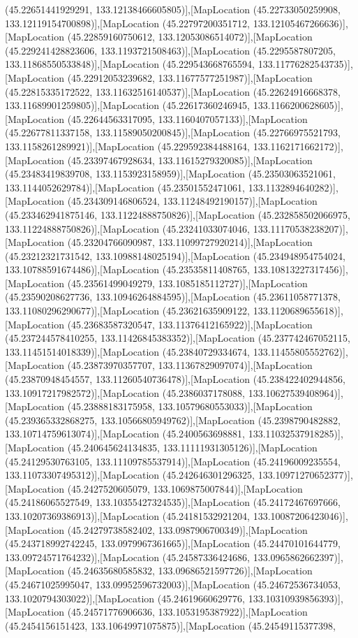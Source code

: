 (45.22651441929291, 133.12138466605805)],[MapLocation (45.22733050259908, 133.12119154700898)],[MapLocation (45.22797200351712, 133.12105467266636)],[MapLocation (45.22859160750612, 133.12053086514072)],[MapLocation (45.229241428823606, 133.1193721508463)],[MapLocation (45.2295587807205, 133.11868550533848)],[MapLocation (45.229543668765594, 133.11776282543735)],[MapLocation (45.22912053239682, 133.11677577251987)],[MapLocation (45.22815335172522, 133.11632516140537)],[MapLocation (45.22624916668378, 133.11689901259805)],[MapLocation (45.22617360246945, 133.1166200628605)],[MapLocation (45.22644563317095, 133.1160407057133)],[MapLocation (45.22677811337158, 133.11589050200845)],[MapLocation (45.22766975521793, 133.1158261289921)],[MapLocation (45.229592384488164, 133.1162171662172)],[MapLocation (45.23397467928634, 133.11615279320085)],[MapLocation (45.23483419839708, 133.1153923158959)],[MapLocation (45.23503063521061, 133.1144052629784)],[MapLocation (45.23501552471061, 133.1132894640282)],[MapLocation (45.234309146806524, 133.11248492190157)],[MapLocation (45.233462941875146, 133.11224888750826)],[MapLocation (45.232858502066975, 133.11224888750826)],[MapLocation (45.23241033074046, 133.11170538238207)],[MapLocation (45.23204766090987, 133.11099727920214)],[MapLocation (45.23212321731542, 133.10988148025194)],[MapLocation (45.234948954754024, 133.10788591674486)],[MapLocation (45.23535811408765, 133.10813227317456)],[MapLocation (45.23561499049279, 133.1085185112727)],[MapLocation (45.23590208627736, 133.10946264884595)],[MapLocation (45.23611058771378, 133.11080296290677)],[MapLocation (45.23621635909122, 133.1120689655618)],[MapLocation (45.23683587320547, 133.11376412165922)],[MapLocation (45.237244578410255, 133.11426845383352)],[MapLocation (45.237742467052115, 133.11451514018339)],[MapLocation (45.23840729334674, 133.11455805552762)],[MapLocation (45.23873970357707, 133.11367829097074)],[MapLocation (45.23870948454557, 133.11260540736478)],[MapLocation (45.238422402944856, 133.10917217982572)],[MapLocation (45.2386037178088, 133.10627539408964)],[MapLocation (45.23888183175958, 133.10579680553033)],[MapLocation (45.239365332868275, 133.10566805949762)],[MapLocation (45.2398790482882, 133.10714759613074)],[MapLocation (45.2400563698881, 133.11032537918285)],[MapLocation (45.240645624134835, 133.11111931305126)],[MapLocation (45.24129530763105, 133.11109785537914)],[MapLocation (45.24196009235554, 133.11073307495312)],[MapLocation (45.242646301296325, 133.10971270652377)],[MapLocation (45.2427520605079, 133.1069875007844)],[MapLocation (45.24186065527549, 133.10355427324535)],[MapLocation (45.24172467697666, 133.10207369386913)],[MapLocation (45.24181532921204, 133.10087206423046)],[MapLocation (45.24279738582402, 133.0987906700349)],[MapLocation (45.243718992742245, 133.0979967361665)],[MapLocation (45.24470101644779, 133.09724571764232)],[MapLocation (45.24587336424686, 133.0965862662397)],[MapLocation (45.24635680585832, 133.09686521597726)],[MapLocation (45.24671025995047, 133.09952596732003)],[MapLocation (45.24672536734053, 133.1020794303022)],[MapLocation (45.24619660629776, 133.10310939856393)],[MapLocation (45.24571776906636, 133.1053195387922)],[MapLocation (45.2454156151423, 133.10649971075875)],[MapLocation (45.24549115377398, 